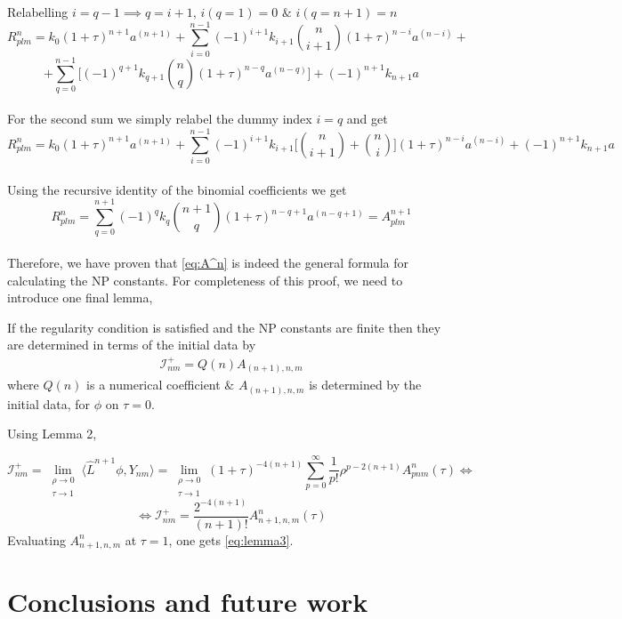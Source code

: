 \documentclass[
11pt, %
english, %
singlespacing, %
headsepline, %
]{MastersDoctoralThesis} %
\begin{document}
Relabelling $i = q-1 \implies q = i+1$, \enspace $i(q=1) = 0$ $\&$ $i(q=n+1) = n$
$$R^{n}_{plm} = k_0(1+\tau)^{n+1}a^{(n+1)} + \sum_{i=0}^{n-1}(-1)^{i+1} k_{i+1} \binom{n}{i+1}(1+\tau)^{n-i} a^{(n-i)} + $$
$$ + \sum_{q=0}^{n-1} \bigg[(-1)^{q+1}k_{q+1}\binom{n}{q}(1+\tau)^{n-q}a^{(n-q)} \bigg] + (-1)^{n+1}k_{n+1}a$$
\\
For the second sum we simply relabel the dummy index $i=q$ and get
$$R^{n}_{plm} = k_0(1+\tau)^{n+1}a^{(n+1)} + \sum_{i=0}^{n-1}(-1)^{i+1} k_{i+1} \bigg[\binom{n}{i+1}+\binom{n}{i} \bigg](1+\tau)^{n-i} a^{(n-i)} + (-1)^{n+1}k_{n+1}a$$
\\
Using the recursive identity of the binomial coefficients we get
$$R^{n}_{plm} = \sum_{q=0}^{n+1}(-1)^{q}k_{q}\binom{n+1}{q}(1+\tau)^{n-q+1}a^{(n-q+1)} = A^{n+1}_{plm}$$
\\
Therefore, we have proven that \eqref{eq:A^n} is indeed the general formula for calculating the NP constants. For completeness of this proof, we need to introduce one final lemma,

\begin{lemma}\label{lemma3}
	\item If the regularity condition is satisfied and the NP constants are finite then they are determined in terms of the initial data by
	 \begin{align}\label{eq:lemma3}
		\mathcal{I}^+_{nm} = Q(n)A_{(n+1),n,m}
	 \end{align}
	where $Q(n)$ is a numerical coefficient $\&$ $A_{(n+1),n,m}$ is determined by the initial data, for $\phi$ on $\tau = 0$.
\end{lemma}

Using Lemma 2, %

$$\mathcal{I}^+_{nm} = \lim_{\substack{\rho \to 0 \\ \tau \to 1}} \langle\hat{L}^{n+1}\phi, Y_{nm}\rangle = \lim_{\substack{\rho \to 0 \\ \tau \to 1}}(1+\tau)^{-4(n+1)}\sum_{p=0}^{\infty}\frac{1}{p!}\rho^{p-2(n+1)}A^{n}_{pnm}(\tau) \Leftrightarrow $$
$$\Leftrightarrow \mathcal{I}^+_{nm} = \frac{2^{-4(n+1)}}{(n+1)!}A^{n}_{n+1,n,m}(\tau)$$
Evaluating $A^{n}_{n+1,n,m}$ at $\tau = 1$, one gets \eqref{eq:lemma3}.
\section{Conclusions and future work}
\end{document}
